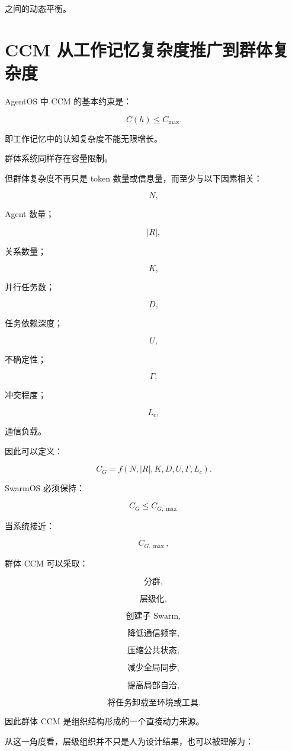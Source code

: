 之间的动态平衡。


\section{CCM 从工作记忆复杂度推广到群体复杂度}

AgentOS 中 CCM 的基本约束是：

\[
C(h)
\leq
C_{\max}.
\]

即工作记忆中的认知复杂度不能无限增长。

群体系统同样存在容量限制。

但群体复杂度不再只是 token 数量或信息量，而至少与以下因素相关：

\[
N,
\]

Agent 数量；

\[
|R|,
\]

关系数量；

\[
K,
\]

并行任务数；

\[
D,
\]

任务依赖深度；

\[
U,
\]

不确定性；

\[
\Gamma,
\]

冲突程度；

\[
L_c,
\]

通信负载。

因此可以定义：

\[
C_G
=
f
\left(
N,
|R|,
K,
D,
U,
\Gamma,
L_c
\right).
\]

SwarmOS 必须保持：

\[
\boxed{
C_G
\leq
C_{G,\max}
}
\]

当系统接近：

\[
C_{G,\max},
\]

群体 CCM 可以采取：

\[
\text{分群},
\]

\[
\text{层级化},
\]

\[
\text{创建子 Swarm},
\]

\[
\text{降低通信频率},
\]

\[
\text{压缩公共状态},
\]

\[
\text{减少全局同步},
\]

\[
\text{提高局部自治},
\]

\[
\text{将任务卸载至环境或工具}.
\]

因此群体 CCM 是组织结构形成的一个直接动力来源。

从这一角度看，层级组织并不只是人为设计结果，也可以被理解为：

